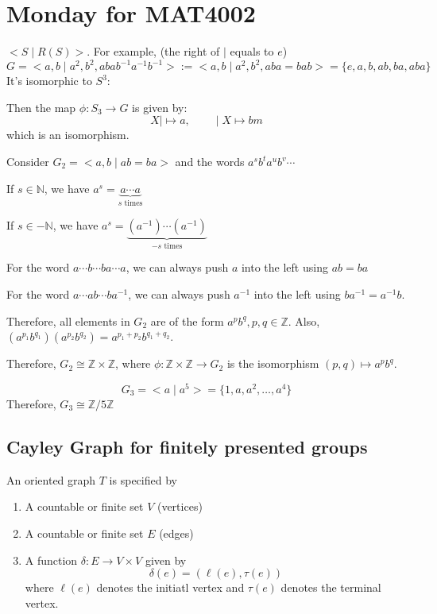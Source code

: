 \section{Monday for MAT4002}
\begin{example}
$<S\mid R(S)>$. For example, (the right of $\mid$ equals to $e$)
\[
G=<a,b\mid a^2,b^2,abab^{-1}a^{-1}b^{-1}>:=
<a,b\mid a^2,b^2,aba=bab>
=
\{
e,a,b,ab,ba,aba
\}
\]
It's isomorphic to $S^3$:


Then the map $\phi:S_3\to G$ is given by:
\[
X\mid\mapsto a,\qquad
\mid X\mapsto bm
\]
which is an isomorphism.
\end{example}
\begin{example}
Consider $G_2=<a,b\mid ab=ba>$ and the words $a^sb^ta^ub^v\cdots$

If $s\in\mathbb{N}$, we have $a^s=\underbrace{a\cdots a}_{s\text{ times}}$

If $s\in-\mathbb{N}$, we have $a^s=\underbrace{(a^{-1})\cdots (a^{-1})}_{-s\text{ times}}$

For the word $a\cdots b\cdots b a\cdots a$, we can always push $a$ into the left using $ab=ba$

For the word $a\cdots a b\cdots ba^{-1}$, we can always push $a^{-1}$ into the left using $ba^{-1}=a^{-1}b$.

Therefore, all elements in $G_2$ are of the form $a^pb^q,p,q\in\mathbb{Z}$.
Also, $(a^{p_1}b^{q_1})(a^{p_2}b^{q_2})=a^{p_1+p_2}b^{q_1+q_2}$.

Therefore, $G_2\cong \mathbb{Z}\times\mathbb{Z}$, where $\phi:\mathbb{Z}\times\mathbb{Z}\to G_2$ is the isomorphism $(p,q)\mapsto a^pb^q$.
\end{example}

\begin{example}
\[
G_3=<a\mid a^5>=\{1,a,a^2,\dots,a^4\}
\]
Therefore, $G_3\cong \mathbb{Z}/5\mathbb{Z}$
\end{example}

\subsection{Cayley Graph for finitely presented groups}
\begin{definition}
An oriented graph $T$ is specified by
\begin{enumerate}
\item
A countable or finite set $V$ (vertices)
\item
A countable or finite set $E$ (edges)
\item
A function $\delta:E\to V\times V$ given by
\[
\delta(e) = (\ell(e),\tau(e))
\]
where $\ell(e)$ denotes the initiatl vertex and $\tau(e)$ denotes the terminal vertex.
\end{enumerate}
\end{definition}

